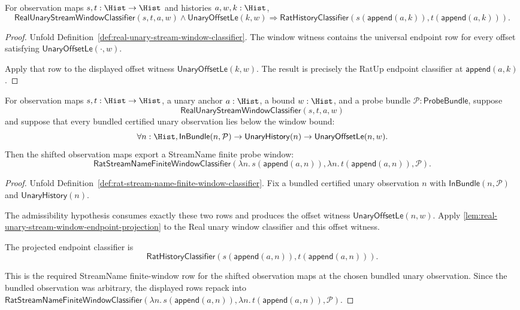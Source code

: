 \begin{lemma}
\label{lem:real-unary-stream-window-endpoint-projection}
For observation maps $s,t:\Hist\to\Hist$ and histories $a,w,k:\Hist$,
$$
\mathsf{RealUnaryStreamWindowClassifier}(s,t,a,w)\land
\mathsf{UnaryOffsetLe}(k,w)
\Longrightarrow
\mathsf{RatHistoryClassifier}(
s(\mathsf{append}(a,k)),t(\mathsf{append}(a,k))).
$$
\end{lemma}
\begin{proof}
Unfold Definition~\ref{def:real-unary-stream-window-classifier}. The window
witness contains the universal endpoint row for every offset satisfying
$\mathsf{UnaryOffsetLe}(\cdot,w)$.

Apply that row to the displayed offset witness
$\mathsf{UnaryOffsetLe}(k,w)$. The result is precisely the RatUp endpoint
classifier at $\mathsf{append}(a,k)$.
\end{proof}

\begin{theorem}
\label{thm:real-unary-stream-window-finite-probe-coverage}
For observation maps $s,t:\Hist\to\Hist$, a unary anchor $a:\Hist$, a bound
$w:\Hist$, and a probe bundle $\mathcal{P}:\mathsf{ProbeBundle}$, suppose
$$
\mathsf{RealUnaryStreamWindowClassifier}(s,t,a,w)
$$
and suppose that every bundled certified unary observation lies below the
window bound:
$$
\forall n:\Hist,
\mathsf{InBundle}(n,\mathcal{P})\to
\mathsf{UnaryHistory}(n)\to
\mathsf{UnaryOffsetLe}(n,w).
$$
Then the shifted observation maps export a StreamName finite probe window:
$$
\mathsf{RatStreamNameFiniteWindowClassifier}
(\lambda n.\,s(\mathsf{append}(a,n)),
\lambda n.\,t(\mathsf{append}(a,n)),
\mathcal{P}).
$$
\end{theorem}
\begin{proof}
Unfold Definition~\ref{def:rat-stream-name-finite-window-classifier}. Fix a
bundled certified unary observation $n$ with
$\mathsf{InBundle}(n,\mathcal{P})$ and $\mathsf{UnaryHistory}(n)$.

The admissibility hypothesis consumes exactly these two rows and produces the
offset witness $\mathsf{UnaryOffsetLe}(n,w)$. Apply
\autoref{lem:real-unary-stream-window-endpoint-projection} to the Real unary
window classifier and this offset witness.

The projected endpoint classifier is
$$
\mathsf{RatHistoryClassifier}
(s(\mathsf{append}(a,n)),t(\mathsf{append}(a,n))).
$$

This is the required StreamName finite-window row for the shifted observation
maps at the chosen bundled unary observation. Since the bundled observation was
arbitrary, the displayed rows repack into
$\mathsf{RatStreamNameFiniteWindowClassifier}
(\lambda n.\,s(\mathsf{append}(a,n)),
\lambda n.\,t(\mathsf{append}(a,n)),\mathcal{P})$.
\end{proof}

